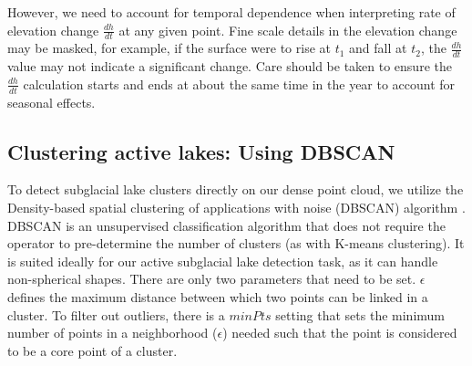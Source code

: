 However, we need to account for temporal dependence when interpreting rate of elevation change $\frac{dh}{dt}$ at any given point.
Fine scale details in the elevation change may be masked, for example, if the surface were to rise at $t_1$ and fall at $t_2$, the $\frac{dh}{dt}$ value may not indicate a significant change.
Care should be taken to ensure the $\frac{dh}{dt}$ calculation starts and ends at about the same time in the year to account for seasonal effects.


\subsection{Clustering active lakes: Using DBSCAN} \label{sec:dbscan}

To detect subglacial lake clusters directly on our dense point cloud, we utilize the Density-based spatial clustering of applications with noise (DBSCAN) algorithm \citep{SchubertDBSCANRevisitedRevisited2017}.
DBSCAN is an unsupervised classification algorithm that does not require the operator to pre-determine the number of clusters (as with K-means clustering).
It is suited ideally for our active subglacial lake detection task, as it can handle non-spherical shapes.
There are only two parameters that need to be set.
$\epsilon$ defines the maximum distance between which two points can be linked in a cluster.
To filter out outliers, there is a $minPts$ setting that sets the minimum number of points in a neighborhood ($\epsilon$) needed such that the point is considered to be a core point of a cluster.

